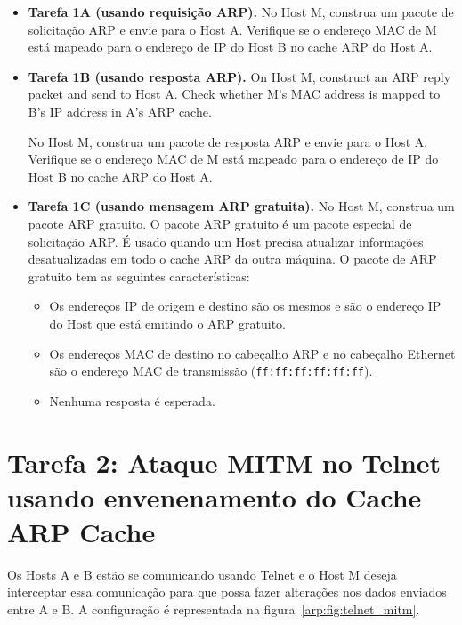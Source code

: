 	
	\begin{itemize}
		\item \textbf{Tarefa 1A (usando requisição ARP).} No Host M, construa um pacote de solicitação ARP e envie
		para o Host A. Verifique se o endereço MAC de M está mapeado para o endereço de IP do Host B no cache ARP do Host A.
		
		
		\item \textbf{Tarefa 1B (usando resposta ARP).} On Host M, construct an ARP reply packet and send to
		Host A. Check whether M's MAC address is mapped to B's IP address in A's ARP cache.
		
		No Host M, construa um pacote de resposta ARP e envie para o
		Host A. Verifique se o endereço MAC de M está mapeado para o endereço de IP do Host B no cache ARP do Host A.
		
		
		
		\item \textbf{Tarefa 1C (usando mensagem ARP gratuita).} No Host M, construa um pacote ARP gratuito. O pacote ARP gratuito 
		é um pacote especial de solicitação ARP. É usado quando um Host precisa atualizar 
		informações desatualizadas em todo o cache ARP da outra máquina. O pacote de ARP gratuito
		tem as seguintes características:
		
		
		\begin{itemize}
			\item Os endereços IP de origem e destino são os mesmos e são 
			o endereço IP do Host que está emitindo o ARP gratuito.
			
			\item Os endereços MAC de destino no cabeçalho ARP e no cabeçalho Ethernet são o endereço 
			MAC de transmissão ({\tt ff:ff:ff:ff:ff:ff}).
			
			\item Nenhuma resposta é esperada.
		\end{itemize}
	\end{itemize}
	
	
	
	\section{Tarefa 2: Ataque MITM no Telnet usando envenenamento do Cache ARP Cache}
	
	Os Hosts A e B estão se comunicando usando Telnet e o Host M deseja interceptar essa
	comunicação para que possa fazer alterações nos dados enviados entre A e B. A configuração é representada
	na figura~\ref{arp:fig:telnet_mitm}. 
	
